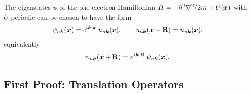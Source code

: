\begin{theorem}
The eigenstates $\psi$ of the one-electron Hamiltonian $H = -\hbar^2\nabla^2/2m + U(\bm{x})$ with $U$ periodic can be chosen to have the form
\begin{equation}
    \psi_{n\lvect{k}}(\lvect{x}) = e^{i\lvect{k}\cdot\lvect{x}}\, u_{n\lvect{k}}(\lvect{x}),
    \qquad u_{n\lvect{k}}(\lvect{x}+\cvect{R}) = u_{n\lvect{k}}(\lvect{x}),
\end{equation}
equivalently
\begin{equation}
    \psi_{n\lvect{k}}(\lvect{x}+\cvect{R}) = e^{i\lvect{k}\cdot\cvect{R}}\, \psi_{n\lvect{k}}(\lvect{x}).
    \label{eq:bloch-condition}
\end{equation}
\end{theorem}

\subsection{First Proof: Translation Operators}

